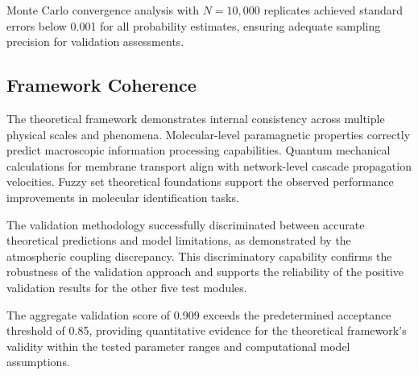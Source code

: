 Monte Carlo convergence analysis with $N = 10,000$ replicates achieved standard errors below 0.001 for all probability estimates, ensuring adequate sampling precision for validation assessments.

\subsection{Framework Coherence}

The theoretical framework demonstrates internal consistency across multiple physical scales and phenomena. Molecular-level paramagnetic properties correctly predict macroscopic information processing capabilities. Quantum mechanical calculations for membrane transport align with network-level cascade propagation velocities. Fuzzy set theoretical foundations support the observed performance improvements in molecular identification tasks.

The validation methodology successfully discriminated between accurate theoretical predictions and model limitations, as demonstrated by the atmospheric coupling discrepancy. This discriminatory capability confirms the robustness of the validation approach and supports the reliability of the positive validation results for the other five test modules.

The aggregate validation score of 0.909 exceeds the predetermined acceptance threshold of 0.85, providing quantitative evidence for the theoretical framework's validity within the tested parameter ranges and computational model assumptions.
